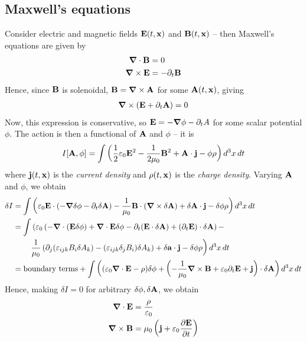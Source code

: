 \documentclass{../template/note}
\begin{document}
    \subsection{Maxwell's equations}

    Consider electric and magnetic fields $\V E(t, \V x)$ and $\V B(t, \V x)$ -- then Maxwell's equations are given by
    \begin{align*}
        \div \V B &= 0 \\
        \curl \V E &= -\pr_t \V B
    \end{align*}
    Hence, since $\V B$ is solenoidal, $\V B = \curl \V A$ for some $\V A(t, \V x)$, giving
    \begin{align*}
        \curl(\V E + \pr_t \V A) = 0
    \end{align*}
    Now, this expression is conservative, so $\V E = -\grad \phi - \pr_t A$ for some scalar potential $\phi$. The action is then a functional of $\V A$ and $\phi$ -- it is
    \begin{align*}
        I[\V A, \phi] = \int \left(\frac 1 2 \eps_0 \V E^2 - \frac{1}{2\mu_0} \V B^2 + \V A \cdot \V j - \phi\rho\right) d^3 x \D t
    \end{align*}
    where $\V j(t, \V x)$ is the \emph{current density} and $\rho(t, \V x)$ is the \emph{charge density}. Varying $\V A$ and $\phi$, we obtain
    \begin{align*}
        \delta I &= \int \left(\eps_0 \V E \cdot (-\grad \delta \phi - \pr_t \delta \V A) - \frac 1 {\mu_0} \V B \cdot (\curl \delta \V A) + \delta \V A \cdot \V j - \delta \phi \rho \right) d^3 x \D t \\
        &= \int \left(\eps_0 \left(-\div(\V E \delta \phi) + \div \V E \delta \phi - \pr_t (\V E \cdot \delta \V A) + (\pr_t \V E) \cdot \delta \V A\right) -\right.  \\
        & \qquad \left.\frac 1 {\mu_0} \left(\pr_j (\eps_{ijk} B_i \delta A_k) - (\eps_{ijk} \delta_j B_i)\delta A_k\right) + \delta \V a \cdot \V j - \delta \phi \rho\right) d^3 x \D t \\
        &= \text{boundary terms} + \int \left( (\eps_0 \div \V E - \rho) \delta \phi + \left(-\frac 1 {\mu_0} \curl \V B + \eps_0 \pr_t \V E + \V j\right) \cdot \delta \V A\right) d^3 x \D t
    \end{align*}
    Hence, making $\delta I = 0$ for arbitrary $\delta \phi, \delta \V A$, we obtain
    \begin{align*}
        \div \V E &= \frac{\rho}{\eps_0} \\
        \curl \V B &= \mu_0 \left(\V j + \eps_0 \pd{\V E}{t}\right)
    \end{align*}
    
\end{document}
